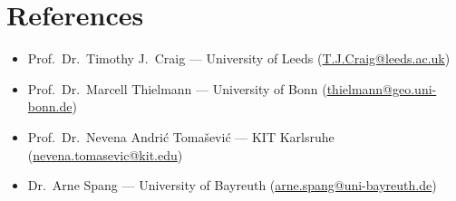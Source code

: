 \documentclass[11pt,a4paper,sans]{moderncv}
\begin{document}

\section{References}
\vspace{1pt}
\begin{itemize}
\item Prof.\ Dr.\ Timothy J.\ Craig --- University of Leeds (\href{mailto:T.J.Craig@leeds.ac.uk}{T.J.Craig@leeds.ac.uk})
\item Prof.\ Dr.\ Marcell Thielmann --- University of Bonn (\href{mailto:thielmann@geo.uni-bonn.de}{thielmann@geo.uni-bonn.de})
\item Prof.\ Dr.\ Nevena Andri\'c Toma\v{s}evi\'c --- KIT Karlsruhe (\href{mailto:nevena.tomasevic@kit.edu}{nevena.tomasevic@kit.edu})
\item Dr.\ Arne Spang --- University of Bayreuth (\href{mailto:arne.spang@uni-bayreuth.de}{arne.spang@uni-bayreuth.de})
\end{itemize}
\end{document}
